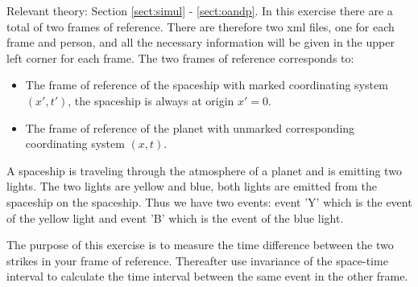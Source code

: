 {\begin{multicols}{2}
Relevant theory: Section \ref{sect:simul} - \ref{sect:oandp}.\newline
In this exercise there are a total of two frames of reference. There are therefore two xml files, one for each frame and person, and all the necessary information will be given in the upper left corner for each frame. The two frames of reference corresponds to:
\begin{itemize}
\item The frame of reference of the spaceship with marked coordinating system $(x',t')$, the spaceship is always at origin $x'=0$.
\item The frame of reference of the planet with unmarked corresponding coordinating system $(x,t)$.
\end{itemize}

A spaceship is traveling through the atmosphere of a planet and is emitting two lights. The two lights are yellow and blue, both lights are emitted from the spaceship on the spaceship. Thus we have two events: event 'Y' which is the event of the yellow light and event 'B' which is the event of the blue light. 

The purpose of this exercise is to measure the time difference between the two strikes in your frame of reference. Thereafter use invariance of the space-time interval to calculate the time interval between the same event in the other frame.


\end{multicols}}
